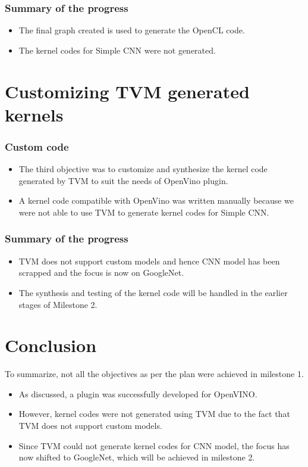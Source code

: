 \documentclass[titlepage]{report}
\begin{document}
\subsection{Summary of the progress}
\begin{itemize}
    \item The final graph created is used to generate the OpenCL code.
    \item The kernel codes for Simple CNN were not generated. 
\end{itemize}

\chapter{ Customizing TVM generated kernels}  

\subsection{Custom code}
\begin{itemize}
    \item The third objective was to customize and synthesize the kernel code generated by TVM to suit the needs of OpenVino plugin.
    \item  A kernel code compatible with OpenVino was written manually because we were not able to use TVM to generate kernel codes for Simple CNN.
    
\end{itemize}
\subsection{Summary of the progress}
\begin{itemize}
\item TVM does not support custom models and hence CNN model has been scrapped and the focus is now on GoogleNet.
\item The synthesis and testing of the kernel code will be handled in the earlier stages of Milestone 2.


\end{itemize}

\chapter{Conclusion}
To summarize, not all the objectives as per the plan were achieved in milestone 1. 
\begin{itemize}
\item As discussed, a plugin was successfully developed for OpenVINO.
\item However, kernel codes were not generated using TVM due to the fact that TVM does not support custom models.
\item Since TVM could not generate kernel codes for CNN model, the focus has now shifted to GoogleNet, which will be achieved in milestone 2.
   
\end{itemize}
\end{document}
